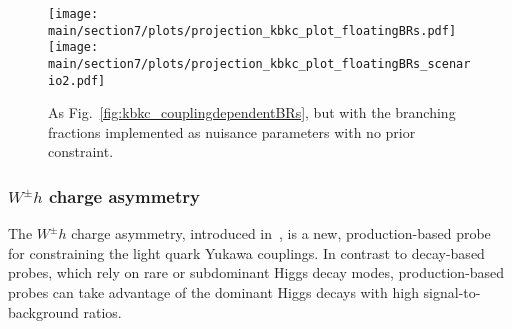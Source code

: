 \documentclass[../report.tex]{subfiles}
\providecommand{\main}{..}
\begin{document}
\begin{figure}[hbtp]
  \begin{center}
    \texttt{[image: \\main/section7/plots/projection\_kbkc\_plot\_floatingBRs.pdf]}
    \texttt{[image: \\main/section7/plots/projection\_kbkc\_plot\_floatingBRs\_scenario2.pdf]}
    \caption{
        As Fig.~\ref{fig:kbkc_couplingdependentBRs}, but with the branching fractions implemented as nuisance parameters with no prior constraint.
        }
    \label{fig:kbkc_floatingBRs}
  \end{center}
\end{figure}


\subsubsection{$W^\pm h$ charge asymmetry}

The $W^\pm h$ charge asymmetry, introduced in~\cite{Yu:2016rvv}, is a
new, production-based probe for constraining the light quark Yukawa
couplings.  In contrast to decay-based probes, which rely on rare or
subdominant Higgs decay modes, production-based probes can take
advantage of the dominant Higgs decays with high signal-to-background
ratios.  
\end{document}

